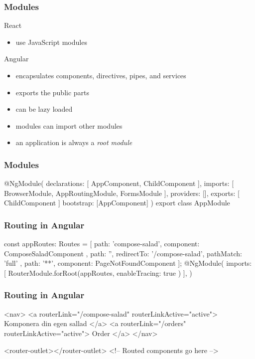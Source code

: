 \begin{frame}[fragile] \frametitle{Modules}
React
\begin{itemize}
  \item use JavaScript modules
\end{itemize}

\vspace{5mm}
Angular
\begin{itemize}
  \item encapsulates components, directives, pipes, and services
  \item exports the public parts
  \item can be lazy loaded
  \item modules can import other modules
  \item an application is always a \emph{root module}
\end{itemize}
\end{frame}

\begin{frame}[fragile] \frametitle{Modules}
\begin{CodeBox}{}
@NgModule({
  declarations: [
    AppComponent,
    ChildComponent
  ],
  imports: [
    BrowserModule,
    AppRoutingModule,
    FormsModule
  ],
  providers: [],
  exports:      [ ChildComponent ]
  bootstrap: [AppComponent]
})
export class AppModule { }

\end{CodeBox}
\end{frame}

\begin{frame}[fragile] \frametitle{Routing in Angular}
\begin{CodeBox}{}
const appRoutes: Routes = [
  { path: 'compose-salad', component: ComposeSaladComponent },
  { path: '',
    redirectTo: '/compose-salad',
    pathMatch: 'full'
  },
  { path: '**', component: PageNotFoundComponent }
];
@NgModule({
  imports: [
    RouterModule.forRoot(appRoutes, { enableTracing: true })
  ],
})
\end{CodeBox}
\end{frame}

\begin{frame}[fragile] \frametitle{Routing in Angular}
\begin{CodeBox}{}
<nav>
  <a routerLink="/compose-salad" routerLinkActive="active">
    Komponera din egen sallad
  </a>
  <a routerLink="/orders" routerLinkActive="active">
    Order
  </a>
</nav>

<router-outlet></router-outlet>
<!-- Routed components go here -->
\end{CodeBox}
\end{frame}

